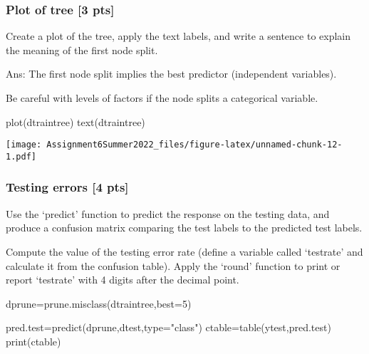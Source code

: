 \documentclass[
]{article}
\newenvironment{Shaded}{\begin{snugshade}}{\end{snugshade}}
\newcommand{\AttributeTok}[1]{\textcolor[rgb]{0.77,0.63,0.00}{#1}}
\newcommand{\DecValTok}[1]{\textcolor[rgb]{0.00,0.00,0.81}{#1}}
\newcommand{\FunctionTok}[1]{\textcolor[rgb]{0.00,0.00,0.00}{#1}}
\newcommand{\NormalTok}[1]{#1}
\newcommand{\OtherTok}[1]{\textcolor[rgb]{0.56,0.35,0.01}{#1}}
\newcommand{\StringTok}[1]{\textcolor[rgb]{0.31,0.60,0.02}{#1}}
\begin{document}
\hypertarget{plot-of-tree-3-pts}{%
\subsubsection{Plot of tree {[}3 pts{]}}\label{plot-of-tree-3-pts}}

Create a plot of the tree, apply the text labels, and write a sentence
to explain the meaning of the first node split.

Ans: The first node split implies the best predictor (independent
variables).

Be careful with levels of factors if the node splits a categorical
variable.

\begin{Shaded}
\begin{Highlighting}[]
\FunctionTok{plot}\NormalTok{(dtraintree)}
\FunctionTok{text}\NormalTok{(dtraintree)}
\end{Highlighting}
\end{Shaded}

\texttt{[image: Assignment6Summer2022\_files/figure-latex/unnamed-chunk-12-1.pdf]}

\hypertarget{testing-errors-4-pts}{%
\subsubsection{Testing errors {[}4 pts{]}}\label{testing-errors-4-pts}}

Use the `predict' function to predict the response on the testing data,
and produce a confusion matrix comparing the test labels to the
predicted test labels.

Compute the value of the testing error rate (define a variable called
`testrate' and calculate it from the confusion table). Apply the `round'
function to print or report `testrate' with 4 digits after the decimal
point.

\begin{Shaded}
\begin{Highlighting}[]
\NormalTok{dprune}\OtherTok{=}\FunctionTok{prune.misclass}\NormalTok{(dtraintree,}\AttributeTok{best=}\DecValTok{5}\NormalTok{)}

\NormalTok{pred.test}\OtherTok{=}\FunctionTok{predict}\NormalTok{(dprune,dtest,}\AttributeTok{type=}\StringTok{"class"}\NormalTok{)}
\NormalTok{ctable}\OtherTok{=}\FunctionTok{table}\NormalTok{(ytest,pred.test)}
\FunctionTok{print}\NormalTok{(ctable)}
\end{Highlighting}
\end{Shaded}
\end{document}
